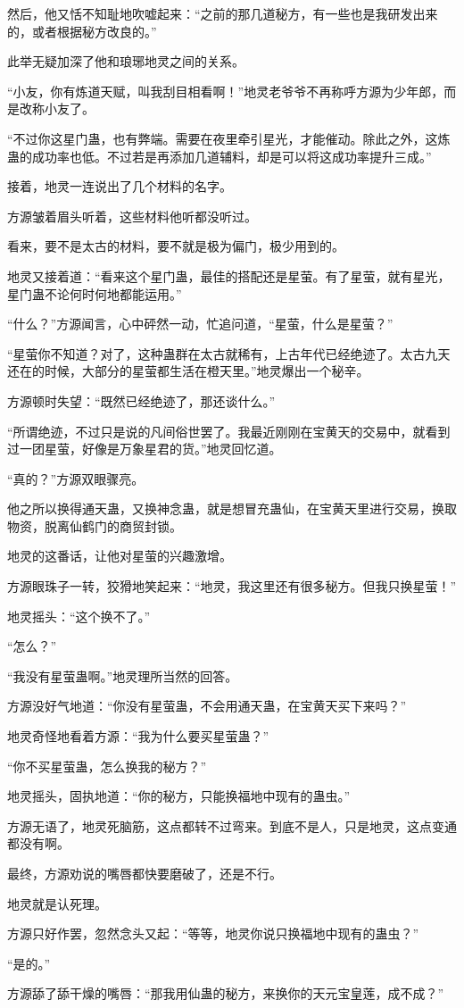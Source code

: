 \begin{this_body}
然后，他又恬不知耻地吹嘘起来：“之前的那几道秘方，有一些也是我研发出来的，或者根据秘方改良的。”

此举无疑加深了他和琅琊地灵之间的关系。

“小友，你有炼道天赋，叫我刮目相看啊！”地灵老爷爷不再称呼方源为少年郎，而是改称小友了。

“不过你这星门蛊，也有弊端。需要在夜里牵引星光，才能催动。除此之外，这炼蛊的成功率也低。不过若是再添加几道辅料，却是可以将这成功率提升三成。”

接着，地灵一连说出了几个材料的名字。

方源皱着眉头听着，这些材料他听都没听过。

看来，要不是太古的材料，要不就是极为偏门，极少用到的。

地灵又接着道：“看来这个星门蛊，最佳的搭配还是星萤。有了星萤，就有星光，星门蛊不论何时何地都能运用。”

“什么？”方源闻言，心中砰然一动，忙追问道，“星萤，什么是星萤？”

“星萤你不知道？对了，这种蛊群在太古就稀有，上古年代已经绝迹了。太古九天还在的时候，大部分的星萤都生活在橙天里。”地灵爆出一个秘辛。

方源顿时失望：“既然已经绝迹了，那还谈什么。”

“所谓绝迹，不过只是说的凡间俗世罢了。我最近刚刚在宝黄天的交易中，就看到过一团星萤，好像是万象星君的货。”地灵回忆道。

“真的？”方源双眼骤亮。

他之所以换得通天蛊，又换神念蛊，就是想冒充蛊仙，在宝黄天里进行交易，换取物资，脱离仙鹤门的商贸封锁。

地灵的这番话，让他对星萤的兴趣激增。

方源眼珠子一转，狡猾地笑起来：“地灵，我这里还有很多秘方。但我只换星萤！”

地灵摇头：“这个换不了。”

“怎么？”

“我没有星萤蛊啊。”地灵理所当然的回答。

方源没好气地道：“你没有星萤蛊，不会用通天蛊，在宝黄天买下来吗？”

地灵奇怪地看着方源：“我为什么要买星萤蛊？”

“你不买星萤蛊，怎么换我的秘方？”

地灵摇头，固执地道：“你的秘方，只能换福地中现有的蛊虫。”

方源无语了，地灵死脑筋，这点都转不过弯来。到底不是人，只是地灵，这点变通都没有啊。

最终，方源劝说的嘴唇都快要磨破了，还是不行。

地灵就是认死理。

方源只好作罢，忽然念头又起：“等等，地灵你说只换福地中现有的蛊虫？”

“是的。”

方源舔了舔干燥的嘴唇：“那我用仙蛊的秘方，来换你的天元宝皇莲，成不成？”

\end{this_body}

